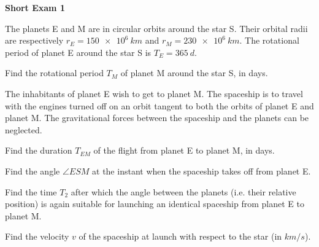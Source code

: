 \documentclass[../TST.tex]{subfiles}
\begin{document}
\begin{large}
	\textbf{Short Exam 1}
\end{large}

\begin{sproblem}
The planets E and M are in circular orbits around the star S. Their orbital radii are respectively $r_E=\qty{150e6}{km}$ and $r_M=\qty{230e6}{km}$. The rotational period of planet E around the star S is $T_E=\qty{365}{d}$.
\begin{subpart}
	\item Find the rotational period $T_M$ of planet M around the star S, in days.
\end{subpart}
The inhabitants of planet E wish to get to planet M. The spaceship is to travel with the engines turned off on an orbit tangent to both the orbits of planet E and planet M. The gravitational forces between the spaceship and the planets can be neglected.
\begin{subpart}[resume]
	\item Find the duration $T_{EM}$ of the flight from planet E to planet M, in days.  
	\item Find the angle $\angle ESM$ at the instant when the spaceship takes off from planet E.
	\item Find the time $T_2$ after which the angle between the planets (i.e. their relative position) is again suitable for launching an identical spaceship from planet E to planet M.
	\item Find the velocity $v$ of the spaceship at launch with respect to the star (in $\unit{km/s}$).
\end{subpart}
\end{sproblem}
\end{document}
